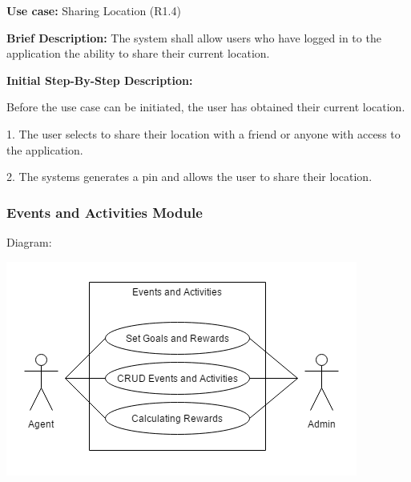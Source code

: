 \documentclass{article}
\begin{document}
\begin{flushleft}
    \textbf{Use case:} Sharing Location  (R1.4)
    \newline
    	
    \textbf{Brief Description:}
    \newline
    The system shall allow users who have logged in to the application the ability to share their current location.
    \newline
    
    \textbf{Initial Step-By-Step Description:}
    
    Before the use case can be initiated, the user has obtained their current location.
	\newline    
	
1. The user selects to share their location with a friend or anyone with access to the application.

2. The systems generates a pin and allows the user to share their location.

\end{flushleft}

\subsubsection{Events and Activities Module}
    Diagram:
    
    \includegraphics[scale=.7]{EventsAndActivities} 
    
\end{document}
